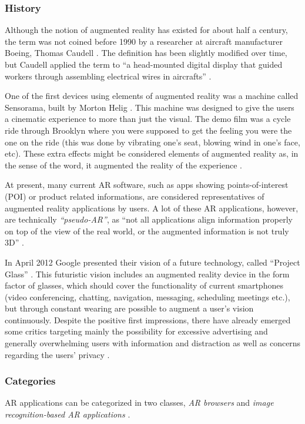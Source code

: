 \documentclass[12pt,journal,compsoc]{IEEEtran}
\begin{document}
\subsubsection{History}
Although the notion of augmented reality has existed for about half a century, the term was not coined before 1990 by a researcher at aircraft manufacturer Boeing, Thomas Caudell \cite{Olsson2011a}. The definition has been slightly modified over time, but Caudell applied the term to “a head-mounted digital display that guided workers through assembling electrical wires in aircrafts” \cite{wiredAR}.

One of the first devices using elements of augmented reality was a machine called Sensorama, built by Morton Helig \cite{HeligVR}. This machine was designed to give the users a cinematic experience to more than just the visual. The demo film was a cycle ride through Brooklyn where you were supposed to get the feeling you were the one on the ride (this was done by vibrating one’s seat, blowing wind in one’s face, etc).  These extra effects might be considered elements of augmented reality as, in the sense of the word, it augmented the reality of the experience \cite{pocketARhistory}.

At present, many current AR software, such as apps showing points-of-interest (POI) or product related informations, are considered representatives of augmented reality applications by users. A lot of these AR applications, however, are technically \textit{“pseudo-AR”}, as “not all applications align information properly on top of the view of the real world, or the augmented information is not truly 3D” \cite{Olsson2011a}. 

In April 2012 Google presented their vision of a future technology, called “Project Glass” \cite{ProjectGlass}. This futuristic vision includes an augmented reality device in the form factor of glasses, which should cover the functionality of current smartphones (video conferencing, chatting, navigation, messaging, scheduling meetings etc.), but through constant wearing are possible to augment a user’s vision continuously. Despite the positive first impressions, there have already emerged some critics targeting mainly the possibility for excessive advertising and generally overwhelming users with information and distraction as well as concerns regarding the users’ privacy \cite{GPGabcnews, GPGwashingtonpost}.


\subsubsection{Categories}
AR applications can be categorized in two classes, \textit{AR browsers} and \textit{image recognition-based AR applications} \cite{Olsson2011a}. 
\end{document}
